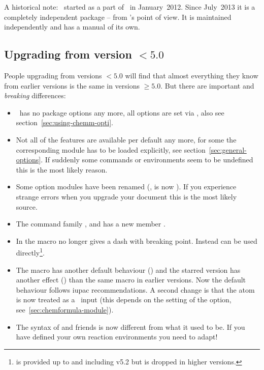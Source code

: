 \documentclass{chemmacros-manual}
\begin{document}
A historical note: \chemformula\ started as a part of \chemmacros\ in
January~2012.  Since July~2013 it is a completely independent package -- from
\chemformula's point of view.  It is maintained independently and has a manual
of its own.

\subsection{Upgrading from version $<5.0$}
People upgrading from versions $<5.0$ will find that almost everything they
know from earlier versions is the same in versions $\geq5.0$.  But there are
important and \emph{breaking} differences:
\begin{itemize}
  \item \chemmacros\ has no package options any more, all options are set via
    , also see section~\vref{sec:using-chemm-opti}.
  \item Not all of the features are available per default any more, for some
    the corresponding module has to be loaded explicitly, see
    section~\ref{sec:general-options}.  If suddenly some commands or
    environments seem to be undefined this is the most likely reason.
  \item Some option modules have been renamed (\eg,  is now
    ).  If you experience strange errors when you upgrade
    your document this is the most likely source.
  \item The command family ,  and
     has a new member .
  \item In  the macro \cs*{-} no longer gives a dash with breaking
    point.  Instead \sym*{-} can be used directly\footnote{\cs*{-} is provided
      up to and including v5.2 but is dropped in higher versions.}.
  \item The macro  has another default behaviour ()
    and the starred version has another effect () than the
    same macro in earlier versions.  Now the default behaviour follows
    \acs{iupac} recommendations.  A second change is that the atom is now
    treated as a \chemformula\ input (this depends on the setting of the
     option, see~\vref{sec:chemformula-module}).
  \item The syntax of  and friends is now different from
    what it used to be.  If you have defined your own reaction environments
    you need to adapt!

\end{itemize}
\end{document}
